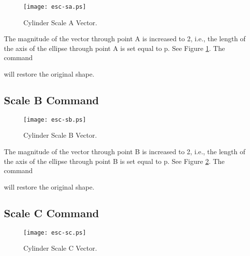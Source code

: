 \begin{figure}
\centering \texttt{[image: esc-sa.ps]}
\caption{Cylinder Scale A Vector.}
\label{esc-sa}
\end{figure}


The magnitude of the vector through point A is increased to 2, i.e.,
the length of the axis of the ellipse through point A is set equal to p.
See Figure \ref{esc-sa}.  The command


will restore the original shape.

\subsection{Scale B Command}

\begin{figure}
\centering \texttt{[image: esc-sb.ps]}
\caption{Cylinder Scale B Vector.}
\label{esc-sb}
\end{figure}


The magnitude of the vector through point B is increased to 2, i.e.,
the length of the axis of the ellipse through point B is set equal to p.
See Figure \ref{esc-sb}.  The command


will restore the original shape.

\subsection{Scale C Command}

\begin{figure}
\centering \texttt{[image: esc-sc.ps]}
\caption{Cylinder Scale C Vector.}
\label{esc-sc}
\end{figure}


